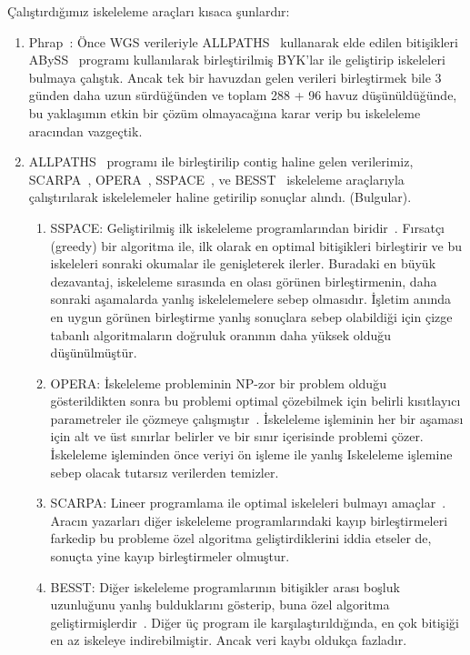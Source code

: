 \documentclass[11pt]{article}
\begin{document}
Çalıştırdığımız iskeleleme araçları kısaca şunlardır:

\begin{enumerate}

\item Phrap~\cite{phrap}: Önce WGS verileriyle ALLPATHS~\cite{Gnerre2011} kullanarak elde edilen bitişikleri ABySS~\cite{Simpson2009} programı kullanılarak birleştirilmiş BYK'lar ile geliştirip iskeleleri bulmaya çalıştık. Ancak tek bir havuzdan gelen verileri birleştirmek bile  3 günden daha uzun sürdüğünden ve toplam 288 + 96 havuz düşünüldüğünde, bu yaklaşımın etkin bir çözüm olmayacağına karar verip bu iskeleleme aracından vazgeçtik.
  
\item ALLPATHS~\cite{Gnerre2011} programı ile birleştirilip contig haline gelen verilerimiz, SCARPA~\cite{Donmez2013}, OPERA~\cite{Gao2011}, SSPACE~\cite{Boetzer2011}, ve BESST~\cite{Sahlin2014} iskeleleme araçlarıyla çalıştırılarak iskelelemeler haline getirilip sonuçlar alındı. (Bulgular). 
  
  \begin{enumerate}
    \item
      SSPACE: Geliştirilmiş ilk iskeleleme programlarından biridir~\cite{Boetzer2011}. Fırsatçı (greedy) bir algoritma ile, ilk olarak en optimal bitişikleri birleştirir ve bu iskeleleri sonraki okumalar ile genişleterek ilerler. Buradaki en büyük dezavantaj, iskeleleme sırasında en olası görünen birleştirmenin, daha sonraki aşamalarda yanlış iskelelemelere sebep olmasıdır. İşletim anında en uygun görünen birleştirme yanlış sonuçlara sebep olabildiği için çizge tabanlı algoritmaların doğruluk oranının daha yüksek olduğu düşünülmüştür. 

    \item OPERA: İskeleleme probleminin NP-zor bir problem olduğu gösterildikten sonra bu problemi optimal çözebilmek için belirli  kısıtlayıcı parametreler ile çözmeye çalışmıştır~\cite{Gao2011}. İskeleleme işleminin her bir aşaması için alt ve üst sınırlar belirler ve bir sınır içerisinde problemi çözer. İskeleleme işleminden önce veriyi ön işleme ile yanlış Iskeleleme işlemine sebep olacak  tutarsız verilerden temizler.
      
    \item SCARPA: Lineer programlama ile optimal iskeleleri bulmayı amaçlar~\cite{Donmez2013}. Aracın yazarları diğer iskeleleme programlarındaki kayıp birleştirmeleri farkedip bu probleme özel algoritma geliştirdiklerini iddia etseler de, sonuçta yine kayıp birleştirmeler olmuştur.
      
\item BESST: Diğer iskeleleme programlarının bitişikler arası boşluk uzunluğunu yanlış bulduklarını gösterip, buna özel algoritma geliştirmişlerdir~\cite{Sahlin2014}. Diğer üç program ile karşılaştırıldığında, en çok bitişiği en az iskeleye indirebilmiştir. Ancak veri kaybı oldukça fazladır.
  \end{enumerate}

\end{enumerate}
\end{document}
